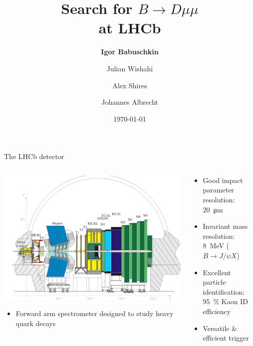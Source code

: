 \documentclass[compress,aspectratio=43]{beamer}
\title{Search for $B\!\to\! D\mu\mu$\\ at LHCb}
\subtitle{ }
\date{\today}
\institute{\small \inst{1}TU Dortmund}
\author[Igor Babuschkin]{\footnotesize \textbf{Igor Babuschkin}\inst{1} \and Julian Wishahi\inst{1} \and Alex Shires\inst{1} \and Johannes Albrecht\inst{1}}
\begin{document}
\maketitle

\begin{frame}[shrink=10]{The LHCb detector}
  \begin{columns}
    \begin{column}{0.7\textwidth}
      \vspace{1em}
      \includegraphics[width=\textwidth,trim=3em 0 0 0,clip]{lhcb.pdf}
      \begin{itemize}
        \item Forward arm spectrometer designed to study heavy quark decays
      \end{itemize}
    \end{column}
  \begin{column}{0.35\textwidth}
    \begin{itemize}
      \item Good impact parameter resolution: \SI{20}{\micro\metre}
      \item Invariant mass resolution: \SI{8}{MeV} ($B\to J/\psi X$)
      \item Excellent particle identification: \SI{95}{\percent} Kaon ID efficiency
      \item Versatile \& efficient trigger
    \end{itemize}
  \end{column}
  \end{columns}
\end{frame}
\end{document}
